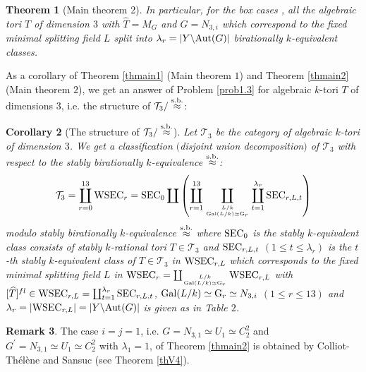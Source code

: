 \documentclass{amsart}
\theoremstyle{plain}
\newtheorem{theorem}{Theorem}[section]
\newtheorem{corollary}[theorem]{Corollary}
\theoremstyle{definition}
\newtheorem{remark}[theorem]{Remark}
\theoremstyle{remark}
\begin{document}
\begin{theorem}[Main theorem 2]
In particular, for the box cases , 
all the algebraic tori $T$ of dimension $3$ 
with $\widehat{T}=M_G$ and $G=N_{3,i}$ 
which correspond to the fixed minimal splitting field $L$ 
split into 
$\lambda_r=|Y\backslash {\rm Aut}(G)|$ birationally $k$-equivalent classes. 
\end{theorem}
%

As a corollary of Theorem \ref{thmain1} (Main theorem $1$) and 
Theorem \ref{thmain2} (Main theorem $2$), 
we get an answer of Problem \ref{prob1.3} 
for algebraic $k$-tori $T$ of dimensions $3$, 
i.e. the structure of $\mathcal{T}_3/\stackrel{\rm s.b.}{\approx}$: 

\begin{corollary}[The structure of $\mathcal{T}_3/\stackrel{\rm s.b.}{\approx}$]\label{cor1.27}
Let $\mathcal{T}_3$ be the category of algebraic $k$-tori of dimension $3$. 
We get a classification $($disjoint union decomposition$)$ 
of $\mathcal{T}_3$ with respect to 
the stably birationally $k$-equivalence $\stackrel{\rm s.b.}{\approx}$: 
\begin{align*}
\mathcal{T}_3=\coprod_{r=0}^{13} {\rm WSEC}_r
={\rm SEC}_0\coprod
\left(\coprod_{r=1}^{13} 
\coprod_{L/k\atop {\rm Gal}(L/k)\simeq {\rm G}_r}
\coprod_{t=1}^{\lambda_{r}} {\rm SEC}_{r,L,t}\right)
\end{align*}
modulo stably birationally $k$-equivalence $\stackrel{\rm s.b.}{\approx}$ 
where ${\rm SEC}_0$ is the stably $k$-equivalent class consists of 
stably $k$-rational tori $T\in \mathcal{T}_3$ %
and 
${\rm SEC}_{r,L,t}$ $(1\leq t\leq \lambda_{r})$ is the $t$-th 
stably $k$-equivalent class of $T\in \mathcal{T}_3$ %
in 
${\rm WSEC}_{r,L}$ which corresponds to the fixed minimal splitting field $L$ 
in 
${\rm WSEC}_r=\coprod_{L/k\atop {\rm Gal}(L/k)\simeq {\rm G}_r} {\rm WSEC}_{r,L}$ 
with 
$[\widehat{T}]^{fl}\in {\rm WSEC}_{r,L}
=\coprod_{t=1}^{\lambda_r} {\rm SEC}_{r,L,t}$, 
${\rm Gal}(L/k)\simeq {\rm G}_r\simeq N_{3,i}$ 
$(1\leq r\leq 13)$ and 
$\lambda_r=|{\rm WSEC}_{r,L}|=|Y\backslash {\rm Aut}(G)|$
is given as in Table $2$. 
\end{corollary}
%
\begin{remark}
The case $i=j=1$, i.e. $G=N_{3,1}\simeq U_1\simeq C_2^2$ and 
$G^\prime=N_{3,1}\simeq U_1\simeq C_2^2$ with $\lambda_1=1$, 
of Theorem \ref{thmain2} 
is obtained by Colliot-Th\'el\`ene and Sansuc (see Theorem \ref{thV4}). 
\end{remark}
%
\end{document}
